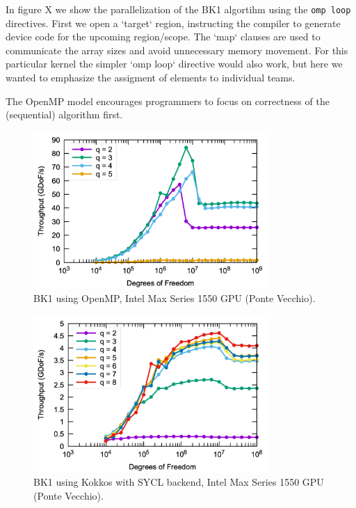 \documentclass[a4paper,12pt]{article}
\begin{document}
In figure X we show the parallelization of the BK1 algortihm using the \texttt{omp loop} directives. First we open a `target` region, instructing the compiler to generate
device code for the upcoming region/scope. The `map` clauses are used to communicate the
array sizes and avoid unnecessary memory movement.
For this particular kernel the simpler `omp loop` directive would also work, but here we wanted
to emphasize the assigment of elements to individual teams.

The OpenMP model encourages programmers to focus on correctness of the
(sequential) algorithm first.

\begin{figure}[htbp]
  \centering
  \includegraphics[width=0.8\textwidth]{pvc_openmp} %
  \caption{BK1 using OpenMP, Intel Max Series 1550 GPU (Ponte Vecchio).}
  \label{fig:pvc_openmp}
\end{figure}

\begin{figure}[htbp]
  \centering
  \includegraphics[width=0.8\textwidth]{pvc_kokkos} %
  \caption{BK1 using Kokkos with SYCL backend, Intel Max Series 1550 GPU (Ponte Vecchio).}
  \label{fig:pvc_kokkos}
\end{figure}
\end{document}

